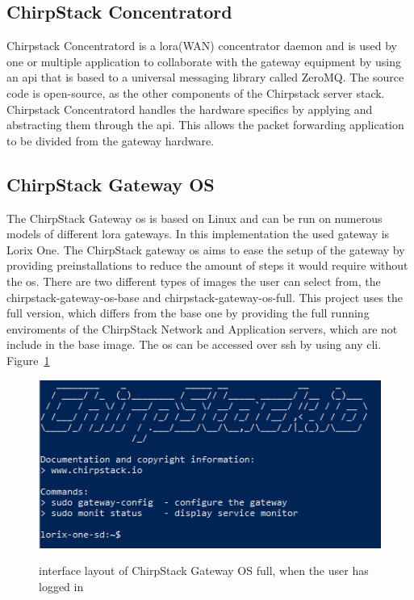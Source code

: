 \subsection{ChirpStack Concentratord}
Chirpstack Concentratord is a \gls{lora}(WAN) concentrator daemon and is used by one or multiple application to collaborate with the gateway equipment by using an \gls{api} that is based to a universal messaging library called ZeroMQ.
The source code is open-source, as the other components of the Chirpstack server stack.
Chirpstack Concentratord handles the hardware specifics by applying and abstracting them through the \gls{api}.
This allows the packet forwarding application to be divided from the gateway hardware.
\cite{chirpstack:concentratord}

\subsection{ChirpStack Gateway OS}
The ChirpStack Gateway \gls{os} is based on Linux and can be run on numerous models of different \gls{lora} gateways.
In this implementation the used gateway is Lorix One.
The ChirpStack gateway \gls{os} aims to ease the setup of the gateway by providing preinstallations to reduce the amount of steps it would require without the \gls{os}.
There are two different types of images the user can select from, the chirpstack-gateway-os-base and chirpstack-gateway-os-full.
This project uses the full version, which differs from the base one by providing the full running enviroments of the ChirpStack Network and Application servers, which are not include in the base image.
The \gls{os} can be accessed over \gls{ssh} by using any \gls{cli}.
Figure~\ref{fig:ChirpStack_gateway_os}
\cite{chirpstack:gateway_os}

\begin{figure}[ht]
  \centering
  {\includegraphics[width=\textwidth]{illustration/chirpstack_io_main_screen.PNG}}
  \caption{interface layout of ChirpStack Gateway OS full, when the user has logged in}
  \label{fig:ChirpStack_gateway_os}
\end{figure}

